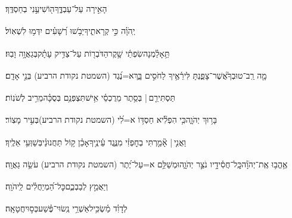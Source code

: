 \documentclass[12pt]{article}
\newcommand{\loc}[1]{\textsuperscript{\locf{#1}}}
\begin{document}
{\loc{ יז}~}‏הָאִ֣ירָה  עַל־עַבְדֶּ֑ךָ{\hfill}ה֖וֹשִׁיעֵ֣נִי בְחַסְדֶּֽךָ׃\par

{\loc{ יח}~}‏יְֽהֹוָ֗ה  כִּ֣י קְרָאתִ֑יךָ{\hfill}יֵבֹ֥שׁוּ רְ֝שָׁעִ֗ים יִדְּמ֥וּ לִשְׁאֽוֹל׃\par

{\loc{ יט}~}‏תֵּ֥אָלַ֗מְנָה{\hfill}שִׂפְתֵ֫י שָׁ֥קֶר\newline\hspace*{.5em}הַדֹּבְר֖וֹת עַל־צַדִּ֥יק עָתָ֗ק{\hfill}בְּגַאֲוָ֥ה וָבֽוּז׃\par

{\loc{ כ}~}‏מָ֤ה רַֽב־טוּבְךָ֮{\hfill}אֲשֶׁר־צָפַ֢נְתָּ לִּירֵ֫אֶ֥יךָ\newline\hspace*{.5em} לַחֹסִ֣ים בָּ֑ךְ{\hfill}א=נֶ֝גֶד (השמטת נקודת הרביע) בְּנֵ֣י אָדָֽם׃\par

{\loc{ כא}~}‏תַּסְתִּירֵ֤ם |  בְּסֵ֥תֶר {\hfill}מֵרֻכְסֵ֫י אִ֥ישׁ\newline\hspace*{.5em}תִּצְפְּנֵ֥ם בְּסֻכָּ֗ה{\hfill}מֵרִ֥יב לְשֹׁנֽוֹת׃\par

{\loc{ כב}~}‏בָּר֥וּךְ יְהֹוָ֑ה{\hfill}כִּ֥י הִפְלִ֘יא חַסְדּ֥וֹ א=לִ֝י (השמטת נקודת הרביע){\hfill}בְּעִ֣יר מָצֽוֹר׃\par

{\loc{ כג}~}‏וַאֲנִ֤י |  אָ֘מַ֤רְתִּי בְחׇפְזִ֗י{\hfill} מִנֶּ֢גֶד עֵ֫ינֶ֥יךָ\newline\hspace*{.5em}אָכֵ֗ן  ק֥וֹל תַּחֲנוּנַ֗י{\hfill}בְּשַׁוְּעִ֥י אֵלֶֽיךָ׃\par

{\loc{ כד}~}‏אֶ֥הֱב֥וּ אֶֽת־יְהֹוָ֗ה{\hfill}כׇּֽל־חֲסִ֫ידָ֥יו\newline\hspace*{.5em} נֹצֵ֣ר יְהֹוָ֑ה{\hfill}וּמְשַׁלֵּ֥ם א=עַל־יֶ֝תֶר (השמטת נקודת הרביע) עֹשֵׂ֥ה גַאֲוָֽה׃\par

{\loc{ כה}~}‏ וְיַאֲמֵ֣ץ לְבַבְכֶ֑ם{\hfill}כׇּל־הַ֝מְיַחֲלִ֗ים לַֽיהֹוָֽה׃\par\pend
\ledpb
\pstart[\subsection*{\textcolor{red}{פרק לב}}]\label{פרק לב}
{\loc{ א}~}‏לְדָוִ֗ד מַ֫שְׂכִּ֥יל\newline\hspace*{.5em}אַשְׁרֵ֥י נְֽשׂוּי־פֶּ֗שַׁע{\hfill}כְּס֣וּי\hspace{1em}חֲטָאָֽה׃\par
\end{document}
